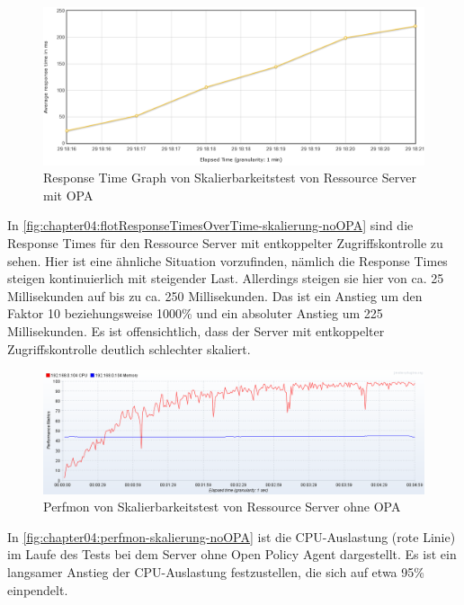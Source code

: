 \begin{figure}[H]
  \centering
  \includegraphics[width=1.0\textwidth]{gfx/flotResponseTimesOverTime-skalierung-opa.png}
  \caption{Response Time Graph von Skalierbarkeitstest von Ressource Server mit OPA}
  \label{fig:chapter04:flotResponseTimesOverTime-skalierung-noOPA}
\end{figure}

In \autoref{fig:chapter04:flotResponseTimesOverTime-skalierung-noOPA} sind die Response Times für den Ressource Server mit entkoppelter Zugriffskontrolle zu sehen. Hier ist eine ähnliche Situation vorzufinden, nämlich die Response Times steigen kontinuierlich mit steigender Last. Allerdings steigen sie hier von ca. 25 Millisekunden auf bis zu ca. 250 Millisekunden. Das ist ein Anstieg um den Faktor 10 beziehungsweise 1000\% und ein absoluter Anstieg um 225 Millisekunden. Es ist offensichtlich, dass der Server mit entkoppelter Zugriffskontrolle deutlich schlechter skaliert. 

\begin{figure}[H]
  \centering
  \includegraphics[width=1.0\textwidth]{gfx/perfmon-skalierung-noOPA.png}
  \caption{Perfmon von Skalierbarkeitstest von Ressource Server ohne OPA}
  \label{fig:chapter04:perfmon-skalierung-noOPA}
\end{figure}

In \autoref{fig:chapter04:perfmon-skalierung-noOPA} ist die CPU-Auslastung (rote Linie) im Laufe des Tests bei dem Server ohne Open Policy Agent dargestellt. Es ist ein langsamer Anstieg der CPU-Auslastung festzustellen, die sich auf etwa 95\% einpendelt. 

